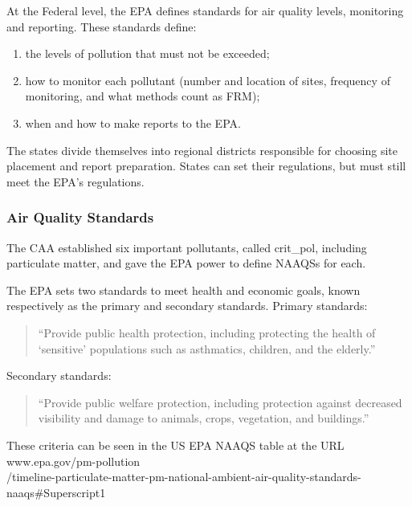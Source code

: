 At the Federal level, the \ac{EPA} defines standards for air quality levels, monitoring and reporting.   These standards define:
\begin{enumerate}
	\item the levels of pollution that must not be exceeded;
	\item how to monitor each pollutant (number and location of sites, frequency of monitoring, and what methods count as \ac{FRM});
	\item when and how to make reports to the \ac{EPA}.
\end{enumerate}

The states divide themselves into regional districts responsible for choosing site placement and report preparation.  States can set their regulations, but must still meet the \ac{EPA}'s regulations. 

\subsubsection*{Air Quality Standards}\label{subsubsec:aqs}
The \ac{CAA} established six important pollutants, called \gls{crit_pol}, 
including particulate matter, and gave the \ac{EPA} power to define \acp{NAAQS} for each.

The \ac{EPA} sets two standards to meet health and economic goals, known respectively as the primary and secondary standards.  Primary standards:
\begin{quote}
	``Provide public health protection, including protecting the health of `sensitive' populations such as asthmatics, children, and the elderly.'' 
\end{quote}
Secondary standards:
\begin{quote}
	``Provide public welfare protection, including protection against decreased visibility and damage to animals, crops, vegetation, and buildings.''  
\end{quote}
These criteria can be 
seen in the US EPA NAAQS table
at the URL\\
www.epa.gov/pm-pollution \\/timeline-particulate-matter-pm-national-ambient-air-quality-standards-naaqs\#Superscript1


